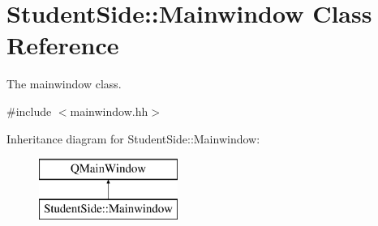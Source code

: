 \hypertarget{class_student_side_1_1_mainwindow}{\section{Student\-Side\-:\-:Mainwindow Class Reference}
\label{class_student_side_1_1_mainwindow}
}


The mainwindow class.  




{\ttfamily \#include $<$mainwindow.\-hh$>$}

Inheritance diagram for Student\-Side\-:\-:Mainwindow\-:\begin{figure}[H]
\begin{center}
\leavevmode
\includegraphics[height=2.000000cm]{class_student_side_1_1_mainwindow}
\end{center}
\end{figure}
